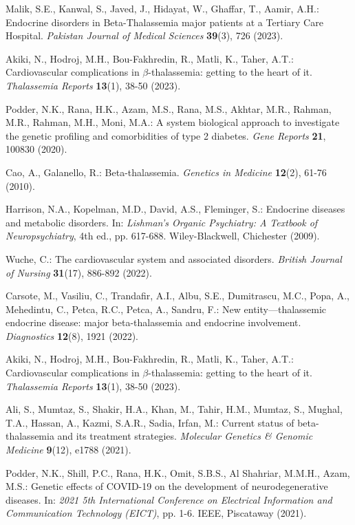 \documentclass[a4paper,12pt,openbib,oneside]{memoir}
\theoremstyle{plain}
\theoremstyle{plain}
\theoremstyle{plain}
\theoremstyle{definition}
\theoremstyle{plain}
\theoremstyle{plain}
\theoremstyle{plain}
\begin{document}
\begin{thebibliography}{45}

Malik, S.E., Kanwal, S., Javed, J., Hidayat, W., Ghaffar, T., Aamir, A.H.: Endocrine disorders in Beta-Thalassemia major patients at a Tertiary Care Hospital. \emph{Pakistan Journal of Medical Sciences} \textbf{39}(3), 726 (2023).

Akiki, N., Hodroj, M.H., Bou-Fakhredin, R., Matli, K., Taher, A.T.: Cardiovascular complications in $\beta$-thalassemia: getting to the heart of it. \emph{Thalassemia Reports} \textbf{13}(1), 38-50 (2023).

Podder, N.K., Rana, H.K., Azam, M.S., Rana, M.S., Akhtar, M.R., Rahman, M.R., Rahman, M.H., Moni, M.A.: A system biological approach to investigate the genetic profiling and comorbidities of type 2 diabetes. \emph{Gene Reports} \textbf{21}, 100830 (2020).

Cao, A., Galanello, R.: Beta-thalassemia. \emph{Genetics in Medicine} \textbf{12}(2), 61-76 (2010).

Harrison, N.A., Kopelman, M.D., David, A.S., Fleminger, S.: Endocrine diseases and metabolic disorders. In: \emph{Lishman's Organic Psychiatry: A Textbook of Neuropsychiatry}, 4th ed., pp. 617-688. Wiley-Blackwell, Chichester (2009).

Wuche, C.: The cardiovascular system and associated disorders. \emph{British Journal of Nursing} \textbf{31}(17), 886-892 (2022).

Carsote, M., Vasiliu, C., Trandafir, A.I., Albu, S.E., Dumitrascu, M.C., Popa, A., Mehedintu, C., Petca, R.C., Petca, A., Sandru, F.: New entity—thalassemic endocrine disease: major beta-thalassemia and endocrine involvement. \emph{Diagnostics} \textbf{12}(8), 1921 (2022).

Akiki, N., Hodroj, M.H., Bou-Fakhredin, R., Matli, K., Taher, A.T.: Cardiovascular complications in $\beta$-thalassemia: getting to the heart of it. \emph{Thalassemia Reports} \textbf{13}(1), 38-50 (2023).

Ali, S., Mumtaz, S., Shakir, H.A., Khan, M., Tahir, H.M., Mumtaz, S., Mughal, T.A., Hassan, A., Kazmi, S.A.R., Sadia, Irfan, M.: Current status of beta-thalassemia and its treatment strategies. \emph{Molecular Genetics \& Genomic Medicine} \textbf{9}(12), e1788 (2021).

Podder, N.K., Shill, P.C., Rana, H.K., Omit, S.B.S., Al Shahriar, M.M.H., Azam, M.S.: Genetic effects of COVID-19 on the development of neurodegenerative diseases. In: \emph{2021 5th International Conference on Electrical Information and Communication Technology (EICT)}, pp. 1-6. IEEE, Piscataway (2021).


\end{thebibliography}
\end{document}
